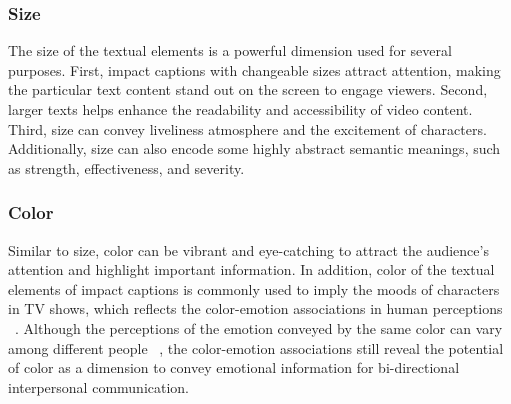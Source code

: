 



\subsubsection{Size}
The size of the textual elements is a powerful dimension used for several purposes.
First, impact captions with changeable sizes attract attention, making the particular text content stand out on the screen to engage viewers.
Second, larger texts helps enhance the readability and accessibility of video content.
Third, size can convey liveliness atmosphere and the excitement of characters.
Additionally, size can also encode some highly abstract semantic meanings, such as strength, effectiveness, and severity.

\subsubsection{Color}
\label{sec_space_color}
Similar to size, color can be vibrant and eye-catching to attract the audience's attention and highlight important information. 
In addition, color of the textual elements of impact captions is commonly used to imply the moods of characters in TV shows, which reflects the color-emotion associations in human perceptions ~\cite{plutchik2013theories, hanada2018correspondence}.
Although the perceptions of the emotion conveyed by the same color can vary among different people ~\cite{wilms2018color, hanada2018correspondence, chen2021bubble}, the color-emotion associations still reveal the potential of color as a dimension to convey emotional information for bi-directional interpersonal communication.



